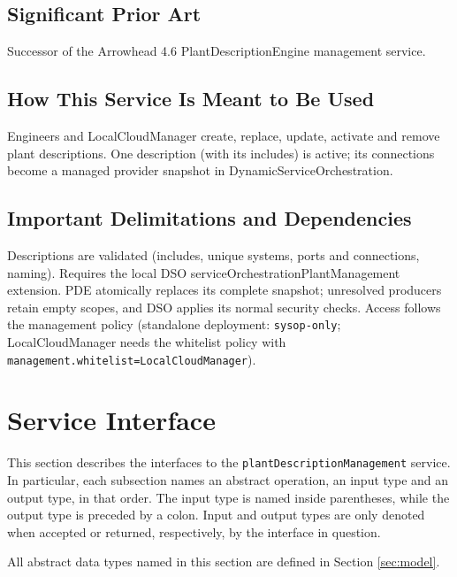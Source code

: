 \documentclass[a4paper]{arrowhead}
\begin{document}
\subsection{Significant Prior Art}

Successor of the Arrowhead 4.6 Plant\allowbreak{}Description\allowbreak{}Engine management service.

\subsection{How This Service Is Meant to Be Used}

Engineers and LocalCloudManager create, replace, update, activate and remove plant descriptions. One description (with its includes) is active; its connections become a managed provider snapshot in Dynamic\allowbreak{}Service\allowbreak{}Orchestration.

\subsection{Important Delimitations and Dependencies}
\label{sec:delimitations}

Descriptions are validated (includes, unique systems, ports and connections, naming). Requires the local DSO service\allowbreak{}Orchestration\allowbreak{}Plant\allowbreak{}Management extension. PDE atomically replaces its complete snapshot; unresolved producers retain empty scopes, and DSO applies its normal security checks. Access follows the management policy (standalone deployment: \texttt{sysop-\allowbreak{}only}; LocalCloudManager needs the whitelist policy with \texttt{management.\allowbreak{}whitelist=\allowbreak{}LocalCloudManager}).

\newpage

\section{Service Interface}
\label{sec:operations}

This section describes the interfaces to the \texttt{plant\allowbreak{}Description\allowbreak{}Management} service.
In particular, each subsection names an abstract operation, an input type and an output type, in that order.
The input type is named inside parentheses, while the output type is preceded by a colon.
Input and output types are only denoted when accepted or returned, respectively, by the interface in question.

All abstract data types named in this section are defined in Section \ref{sec:model}.
\end{document}
